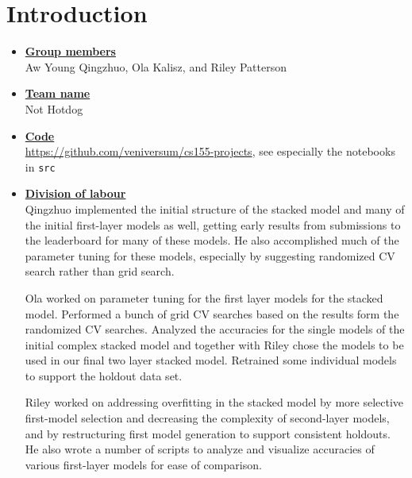 
\newcommand{\boldline}[1]{\underline{\textbf{#1}}}



\pagestyle{fancy}

\section{Introduction}
\medskip
\begin{itemize}

    \item \boldline{Group members} \\
    Aw Young Qingzhuo, Ola Kalisz, and Riley Patterson

    \item \boldline{Team name} \\
    Not Hotdog

    \item \boldline{Code} \\
    \url{https://github.com/veniversum/cs155-projects}, see especially the notebooks in \texttt{src}

    \item \boldline{Division of labour} \\
    Qingzhuo implemented the initial structure of the stacked model and many of the initial first-layer models as well, getting early results from submissions to the leaderboard for many of these models. He also accomplished much of the parameter tuning for these models, especially by suggesting randomized CV search rather than grid search.

    Ola worked on parameter tuning for the first layer models for the stacked model. Performed a bunch of grid CV searches based on the results form the randomized CV searches. Analyzed the accuracies for the single models of the initial complex stacked model and together with Riley chose the models to be used in our final two layer stacked model. Retrained some individual models to support the holdout data set.

    Riley worked on addressing overfitting in the stacked model by more selective first-model selection and decreasing the complexity of second-layer models, and by restructuring first model generation to support consistent holdouts. He also wrote a number of scripts to analyze and visualize accuracies of various first-layer models for ease of comparison.

\end{itemize}



